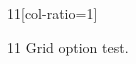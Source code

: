 \documentclass[paper=A4]{ropas-poster}
\begin{document}
\begin{postergrid}{1}{1}[col-ratio={1}]
\begin{posterblock}{1}{1}
Grid option test.
\end{posterblock}
\end{postergrid}
\end{document}
